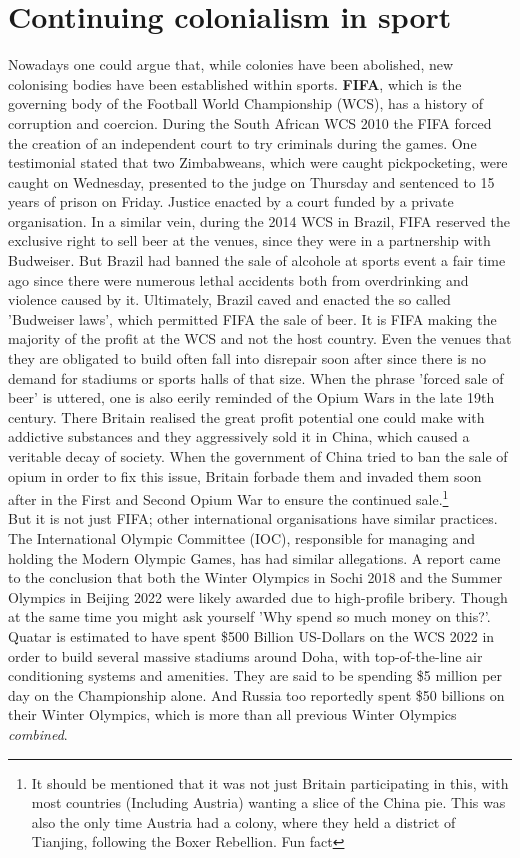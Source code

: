 \documentclass{article}
\begin{document}
	\section{Continuing colonialism in sport}
	Nowadays one could argue that, while colonies have been abolished, new colonising bodies have been established within sports. \textbf{FIFA}, which is the governing body of the Football World Championship (WCS), has a history of corruption and coercion. During the South African WCS 2010 the FIFA forced the creation of an independent court to try criminals during the games. One testimonial stated that two Zimbabweans, which were caught pickpocketing, were caught on Wednesday, presented to the judge on Thursday and sentenced to 15 years of prison on Friday. Justice enacted by a court funded by a private organisation. In a similar vein, during the 2014 WCS in Brazil, FIFA reserved the exclusive right to sell beer at the venues, since they were in a partnership with Budweiser. But Brazil had banned the sale of alcohole at sports event a fair time ago since there were numerous lethal accidents both from overdrinking and violence caused by it. Ultimately, Brazil caved and enacted the so called 'Budweiser laws', which permitted FIFA the sale of beer. It is FIFA making the majority of the profit at the WCS and not the host country. Even the venues that they are obligated to build often fall into disrepair soon after since there is no demand for stadiums or sports halls of that size. When the phrase 'forced sale of beer' is uttered, one is also eerily reminded of the Opium Wars in the late 19th century. There Britain realised the great profit potential one could make with addictive substances and they aggressively sold it in China, which caused a veritable decay of society. When the government of China tried to ban the sale of opium in order to fix this issue, Britain forbade them and invaded them soon after in the First and Second Opium War to ensure the continued sale.\footnote{It should be mentioned that it was not just Britain participating in this, with most countries (Including Austria) wanting a slice of the China pie. This was also the only time Austria had a colony, where they held a district of Tianjing, following the Boxer Rebellion. Fun fact} \\
	But it is not just FIFA; other international organisations have similar practices. The International Olympic Committee (IOC), responsible for managing and holding the Modern Olympic Games, has had similar allegations. A report came to the conclusion that both the Winter Olympics in Sochi 2018 and the Summer Olympics in Beijing 2022 were likely awarded due to high-profile bribery. Though at the same time you might ask yourself 'Why spend so much money on this?'. Quatar is estimated to have spent \$500 Billion US-Dollars on the WCS 2022 in order to build several massive stadiums around Doha, with top-of-the-line air conditioning systems and amenities. They are said to be spending \$5 million per day on the Championship alone. And Russia too reportedly spent \$50 billions on their Winter Olympics, which is more than all previous Winter Olympics \textit{combined}. \\
\end{document}
